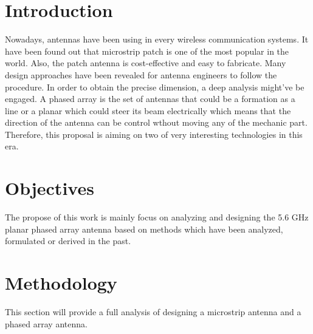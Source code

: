 \maketitle
\tableofcontents
\newpage
\section{Introduction}
  \indent Nowadays, antennas have been using in every wireless communication systems. It have been found out that microstrip patch is one of the most popular\cite{AkS} in the world. Also, the patch antenna is cost-effective and easy to fabricate\cite{AtT}. Many design approaches have been revealed for antenna engineers to follow the procedure. In order to obtain the precise dimension, a deep analysis might've be engaged.
  \indent A phased array is the set of antennas that could be a formation as a line or a planar which could steer its beam electrically\cite{CoB:05} which means that the direction of the antenna can be control wthout moving any of the mechanic part. Therefore, this proposal is aiming on two of very interesting technologies in this era.

\section{Objectives}
  \indent The propose of this work is mainly focus on analyzing and designing the 5.6 GHz planar phased array antenna based on methods which have been analyzed, formulated or derived in the past. 

\section{Methodology}
  \indent This section will provide a full analysis of designing a microstrip antenna and a phased array antenna.

